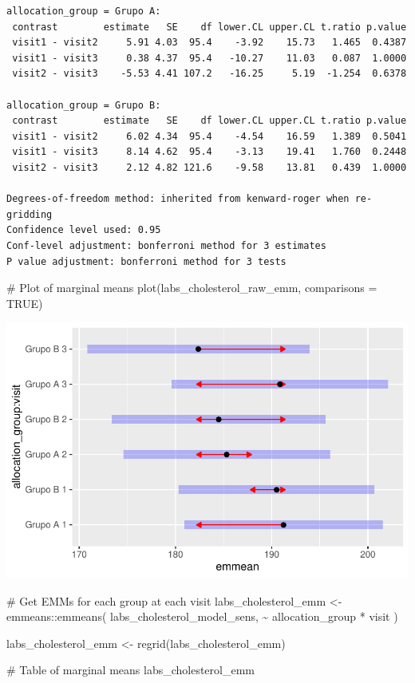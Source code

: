 \documentclass[
  letterpaper,
  DIV=11,
  numbers=noendperiod]{scrartcl}
\newenvironment{Shaded}{\begin{snugshade}}{\end{snugshade}}
\newcommand{\AttributeTok}[1]{\textcolor[rgb]{0.40,0.45,0.13}{#1}}
\newcommand{\CommentTok}[1]{\textcolor[rgb]{0.37,0.37,0.37}{#1}}
\newcommand{\ConstantTok}[1]{\textcolor[rgb]{0.56,0.35,0.01}{#1}}
\newcommand{\FunctionTok}[1]{\textcolor[rgb]{0.28,0.35,0.67}{#1}}
\newcommand{\NormalTok}[1]{\textcolor[rgb]{0.00,0.23,0.31}{#1}}
\newcommand{\OtherTok}[1]{\textcolor[rgb]{0.00,0.23,0.31}{#1}}
\newcommand{\SpecialCharTok}[1]{\textcolor[rgb]{0.37,0.37,0.37}{#1}}
\begin{document}
\begin{verbatim}
allocation_group = Grupo A:
 contrast        estimate   SE    df lower.CL upper.CL t.ratio p.value
 visit1 - visit2     5.91 4.03  95.4    -3.92    15.73   1.465  0.4387
 visit1 - visit3     0.38 4.37  95.4   -10.27    11.03   0.087  1.0000
 visit2 - visit3    -5.53 4.41 107.2   -16.25     5.19  -1.254  0.6378

allocation_group = Grupo B:
 contrast        estimate   SE    df lower.CL upper.CL t.ratio p.value
 visit1 - visit2     6.02 4.34  95.4    -4.54    16.59   1.389  0.5041
 visit1 - visit3     8.14 4.62  95.4    -3.13    19.41   1.760  0.2448
 visit2 - visit3     2.12 4.82 121.6    -9.58    13.81   0.439  1.0000

Degrees-of-freedom method: inherited from kenward-roger when re-gridding 
Confidence level used: 0.95 
Conf-level adjustment: bonferroni method for 3 estimates 
P value adjustment: bonferroni method for 3 tests 
\end{verbatim}

\begin{Shaded}
\begin{Highlighting}[]
\CommentTok{\# Plot of marginal means}
\FunctionTok{plot}\NormalTok{(labs\_cholesterol\_raw\_emm, }\AttributeTok{comparisons =} \ConstantTok{TRUE}\NormalTok{)}
\end{Highlighting}
\end{Shaded}

\includegraphics{Outcomes_V1V2V3_files/figure-pdf/labs_cholesterol_raw_emm-1.pdf}

\begin{Shaded}
\begin{Highlighting}[]
\CommentTok{\# Get EMMs for each group at each visit}
\NormalTok{labs\_cholesterol\_emm }\OtherTok{\textless{}{-}}\NormalTok{ emmeans}\SpecialCharTok{::}\FunctionTok{emmeans}\NormalTok{(}
\NormalTok{    labs\_cholesterol\_model\_sens, }
    \SpecialCharTok{\textasciitilde{}}\NormalTok{ allocation\_group }\SpecialCharTok{*}\NormalTok{ visit}
\NormalTok{)}

\NormalTok{labs\_cholesterol\_emm }\OtherTok{\textless{}{-}} \FunctionTok{regrid}\NormalTok{(labs\_cholesterol\_emm)}

\CommentTok{\# Table of marginal means}
\NormalTok{labs\_cholesterol\_emm}
\end{Highlighting}
\end{Shaded}
\end{document}
